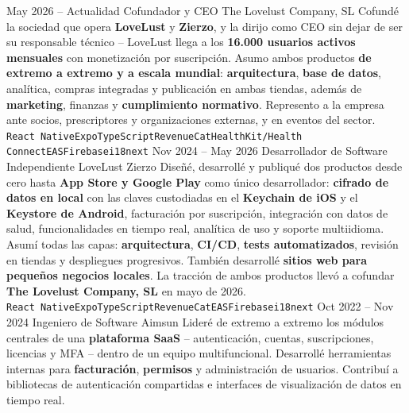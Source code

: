 \documentclass[9pt]{developercv} %
\begin{document}
\begin{entrylist}
	\entry
		{May 2026 -- Actualidad}
		{Cofundador y CEO}
		{The Lovelust Company, SL}
		{Cofundé la sociedad que opera \textbf{LoveLust} y \textbf{Zierzo}, y la dirijo como CEO sin dejar de ser su responsable técnico -- LoveLust llega a los \textbf{16.000 usuarios activos mensuales} con monetización por suscripción. Asumo ambos productos \textbf{de extremo a extremo y a escala mundial}: \textbf{arquitectura}, \textbf{base de datos}, analítica, compras integradas y publicación en ambas tiendas, además de \textbf{marketing}, finanzas y \textbf{cumplimiento normativo}. Represento a la empresa ante socios, prescriptores y organizaciones externas, y en eventos del sector. \\
		\texttt{React Native}\slashsep\texttt{Expo}\slashsep\texttt{TypeScript}\slashsep\texttt{RevenueCat}\slashsep\texttt{HealthKit/Health Connect}\slashsep\texttt{EAS}\slashsep\texttt{Firebase}\slashsep\texttt{i18next}}
	\entry
		{Nov 2024 -- May 2026}
		{Desarrollador de Software Independiente}
		{LoveLust \slashsep Zierzo}
		{Diseñé, desarrollé y publiqué dos productos desde cero hasta \textbf{App Store y Google Play} como único desarrollador: \textbf{cifrado de datos en local} con las claves custodiadas en el \textbf{Keychain de iOS} y el \textbf{Keystore de Android}, facturación por suscripción, integración con datos de salud, funcionalidades en tiempo real, analítica de uso y soporte multiidioma. Asumí todas las capas: \textbf{arquitectura}, \textbf{CI/CD}, \textbf{tests automatizados}, revisión en tiendas y despliegues progresivos. También desarrollé \textbf{sitios web para pequeños negocios locales}. La tracción de ambos productos llevó a cofundar \textbf{The Lovelust Company, SL} en mayo de 2026. \\
		\texttt{React Native}\slashsep\texttt{Expo}\slashsep\texttt{TypeScript}\slashsep\texttt{RevenueCat}\slashsep\texttt{EAS}\slashsep\texttt{Firebase}\slashsep\texttt{i18next}}
	\entry
		{Oct 2022 -- Nov 2024}
		{Ingeniero de Software}
		{Aimsun}
		{Lideré de extremo a extremo los módulos centrales de una \textbf{plataforma SaaS} -- autenticación, cuentas, suscripciones, licencias y MFA -- dentro de un equipo multifuncional. Desarrollé herramientas internas para \textbf{facturación}, \textbf{permisos} y administración de usuarios. Contribuí a bibliotecas de autenticación compartidas e interfaces de visualización de datos en tiempo real. \\
}
\end{entrylist}
\end{document}
